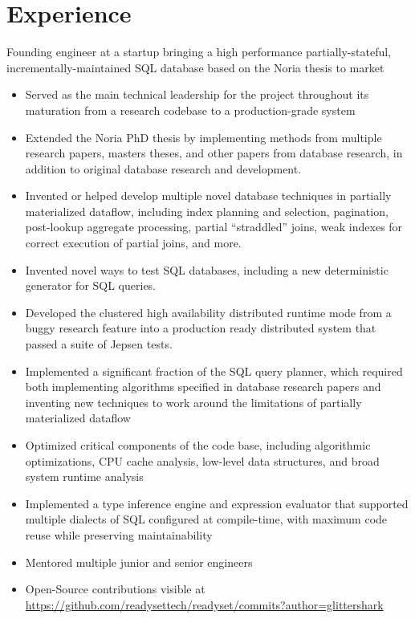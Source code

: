 \documentclass[10pt,a4paper,sans]{moderncv}        %
\begin{document}
\section{Experience}
{Founding engineer at a startup bringing a high performance
  partially-stateful, incrementally-maintained SQL database based on the Noria
  thesis to market
  \begin{itemize}
    \item Served as the main technical leadership for the project throughout its
          maturation from a research codebase to a production-grade system
    \item Extended the Noria PhD thesis by implementing methods from multiple
          research papers, masters theses, and other papers from database
          research, in addition to original database research and development.
    \item Invented or helped develop multiple novel database techniques in
          partially materialized dataflow, including index planning and
          selection, pagination, post-lookup aggregate processing, partial
          ``straddled'' joins, weak indexes for correct execution of partial
          joins, and more.
    \item Invented novel ways to test SQL databases, including a new deterministic
          generator for SQL queries.
    \item Developed the clustered high availability distributed runtime mode from
          a buggy research feature into a production ready distributed system
          that passed a suite of Jepsen tests.
    \item Implemented a significant fraction of the SQL query planner, which
          required both implementing algorithms specified in database research
          papers and inventing new techniques to work around the limitations of
          partially materialized dataflow
    \item Optimized critical components of the code base, including algorithmic
          optimizations, CPU cache analysis, low-level data structures, and
          broad system runtime analysis
    \item Implemented a type inference engine and expression evaluator that
          supported multiple dialects of SQL configured at compile-time, with
          maximum code reuse while preserving maintainability
    \item Mentored multiple junior and senior engineers
    \item Open-Source contributions visible at
          \url{https://github.com/readysettech/readyset/commits?author=glittershark}
  \end{itemize}}
\end{document}
